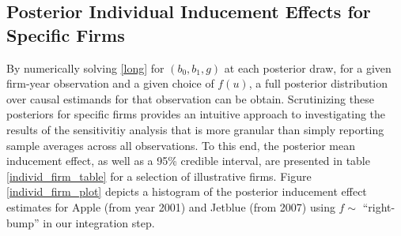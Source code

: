 \documentclass[aoas,preprint, 11pt, dvipsnames, table, x11name]{imsart}
\theoremstyle{remark}
\begin{document}
\subsection{Posterior Individual Inducement Effects for Specific Firms}\label{individ_firms}
By numerically solving \ref{long} for $(b_0, b_1, g)$ at each posterior draw, for a given firm-year observation and a given choice of $f(u)$, a full posterior distribution over causal estimands for that observation can be obtain.  Scrutinizing these posteriors for specific firms provides an intuitive approach to investigating the results of the sensitivitiy analysis that is more granular than simply reporting sample averages across all observations. To this end, the posterior mean inducement effect, as well as a 95\% credible interval, are presented in table \ref{individ_firm_table} for a selection of illustrative firms.  Figure \ref{individ_firm_plot} depicts a histogram of the posterior inducement effect estimates for Apple (from year 2001) and Jetblue (from 2007) using $f\sim$ ``right-bump'' in our integration step.
  
\end{document}
